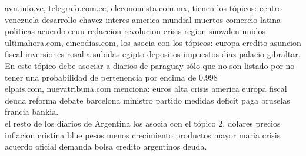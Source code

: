 \documentclass[8.5pt,twoside,twocolumn]{article}
\begin{document}
 avn.info.ve, telegrafo.com.ec, eleconomista.com.mx, tienen los t\'opicos: centro venezuela
 desarrollo chavez interes america mundial muertos comercio latina
 politicas acuerdo eeuu redaccion revolucion crisis region snowden unidos. 	
\\

 ultimahora.com, cincodias.com, los asocia con los t\'opicos: europa credito asuncion
 fiscal inversiones rosalia subidas egipto depositos impuestos diaz palacio gibraltar. 
En este t\'opico debe asociar a diarios de paraguay s\'olo que no son listado por no 
tener una probabilidad de pertenencia por encima de 0.998
\\
 
 elpais.com, nuevatribuna.com menciona: euros alta crisis america europa fiscal 
deuda reforma  debate barcelona ministro partido 
medidas deficit paga bruselas francia bankia.
\\
el resto de los diarios de Argentina los asocia con el t\'opico 2, dolares precios 
inflacion cristina blue pesos menos crecimiento productos mayor maria 
crisis acuerdo oficial demanda bolsa credito argentinos deuda.
\end{document}
